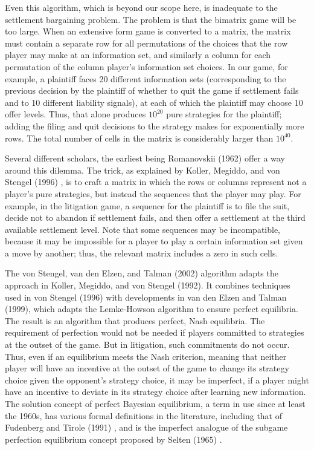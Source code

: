 \documentclass{article}
\begin{document}
Even this algorithm, which is beyond our scope here, is inadequate to the settlement bargaining problem. The problem is that the bimatrix game will be too large. When an extensive form game is converted to a matrix, the matrix must contain a separate row for all permutations of the choices that the row player may make at an information set, and similarly a column for each permutation of the column player's information set choices. In our game, for example, a plaintiff faces 20 different information sets (corresponding to the previous decision by the plaintiff of whether to quit the game if settlement fails and to 10 different liability signals), at each of which the plaintiff may choose 10 offer levels. Thus, that alone produces $10^{20}$ pure strategies for the plaintiff; adding the filing and quit decisions to the strategy makes for exponentially more rows. The total number of cells in the matrix is considerably larger than $10^{40}$. 

Several different scholars, the earliest being Romanovskii (1962) \cite{romanovskii} offer a way around this dilemma. The trick, as explained by Koller, Megiddo, and von Stengel (1996) \cite{kollermegiddovonstengel}, is to craft a matrix in which the rows or columns represent not a player's pure strategies, but instead the sequences that the player may play. For example, in the litigation game, a sequence for the plaintiff is to file the suit, decide not to abandon if settlement fails, and then offer a settlement at the third available settlement level. Note that some sequences may be incompatible, because it may be impossible for a player to play a certain information set given a move by another; thus, the relevant matrix includes a zero in such cells. 

The von Stengel, van den Elzen, and Talman (2002) algorithm adapts the approach in Koller, Megiddo, and von Stengel (1992). It combines techniques used in von Stengel (1996) with developments in van den Elzen and Talman (1999), which adapts the Lemke-Howson algorithm to ensure perfect equilibria. The result is an algorithm that produces perfect, Nash equilibria. The requirement of perfection would not be needed if players committed to strategies at the outset of the game. But in litigation, such commitments do not occur. Thus, even if an equilibrium meets the Nash criterion, meaning that neither player will have an incentive at the outset of the game to change its strategy choice given the opponent's strategy choice, it may be imperfect, if a player might have an incentive to deviate in its strategy choice after learning new information. The solution concept of perfect Bayesian equilibrium, a term in use since at least the 1960s, has various formal definitions in the literature, including that of Fudenberg and Tirole (1991) \cite{fudenberg}, and is the imperfect analogue of the subgame perfection equilibrium concept proposed by Selten (1965) \cite{selten}.
\end{document}

